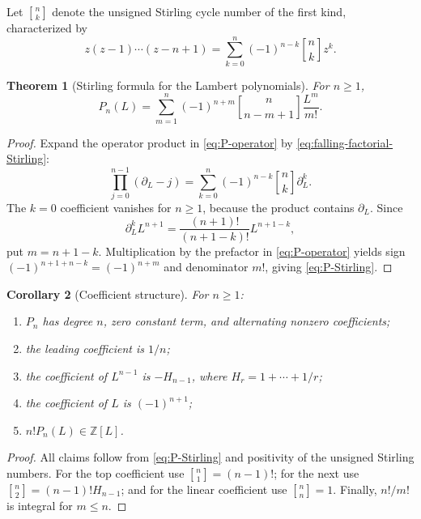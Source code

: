 \documentclass[11pt]{article}
\theoremstyle{pltheorem}
\newtheorem{theorem}{Theorem}[section]
\newtheorem{corollary}[theorem]{Corollary}
\newcommand{\Z}{\mathbb Z}
\newcommand{\stirlingone}[2]{\genfrac{[}{]}{0pt}{}{#1}{#2}}
\begin{document}
Let \(\stirlingone{n}{k}\) denote the unsigned Stirling cycle number of the first kind, characterized by
\begin{equation}\label{eq:falling-factorial-Stirling}
 z(z-1)\cdots(z-n+1)
 =\sum_{k=0}^{n}(-1)^{n-k}\stirlingone{n}{k}z^k.
\end{equation}

\begin{theorem}[Stirling formula for the Lambert polynomials]\label{thm:P-Stirling}
For \(n\ge1\),
\begin{equation}\label{eq:P-Stirling}
 \boxed{\quad
 P_n(L)=\sum_{m=1}^{n}(-1)^{n+m}
 \stirlingone{n}{n-m+1}\frac{L^m}{m!}.
 \quad}
\end{equation}
\end{theorem}

\begin{proof}
Expand the operator product in \cref{eq:P-operator} by
\cref{eq:falling-factorial-Stirling}:
\[
 \prod_{j=0}^{n-1}(\partial_L-j)
 =\sum_{k=0}^{n}(-1)^{n-k}\stirlingone{n}{k}\partial_L^k.
\]
The \(k=0\) coefficient vanishes for \(n\ge1\), because the product contains \(\partial_L\).  Since
\[
 \partial_L^kL^{n+1}=\frac{(n+1)!}{(n+1-k)!}L^{n+1-k},
\]
put \(m=n+1-k\).  Multiplication by the prefactor in
\cref{eq:P-operator} yields sign
\((-1)^{n+1+n-k}=(-1)^{n+m}\) and denominator \(m!\), giving
\cref{eq:P-Stirling}.
\end{proof}

\begin{corollary}[Coefficient structure]\label{cor:P-coeff-structure}
For \(n\ge1\):
\begin{enumerate}[label=\textup{(\roman*)}]
\item \(P_n\) has degree \(n\), zero constant term, and alternating nonzero coefficients;
\item the leading coefficient is \(1/n\);
\item the coefficient of \(L^{n-1}\) is \(-H_{n-1}\), where
\(H_r=1+\cdots+1/r\);
\item the coefficient of \(L\) is \((-1)^{n+1}\);
\item \(n!P_n(L)\in\Z[L]\).
\end{enumerate}
\end{corollary}

\begin{proof}
All claims follow from \cref{eq:P-Stirling} and positivity of the unsigned Stirling numbers.  For the top coefficient use
\(\stirlingone{n}{1}=(n-1)!\); for the next use
\(\stirlingone{n}{2}=(n-1)!H_{n-1}\); and for the linear coefficient use
\(\stirlingone{n}{n}=1\).  Finally, \(n!/m!\) is integral for \(m\le n\).
\end{proof}
\end{document}
